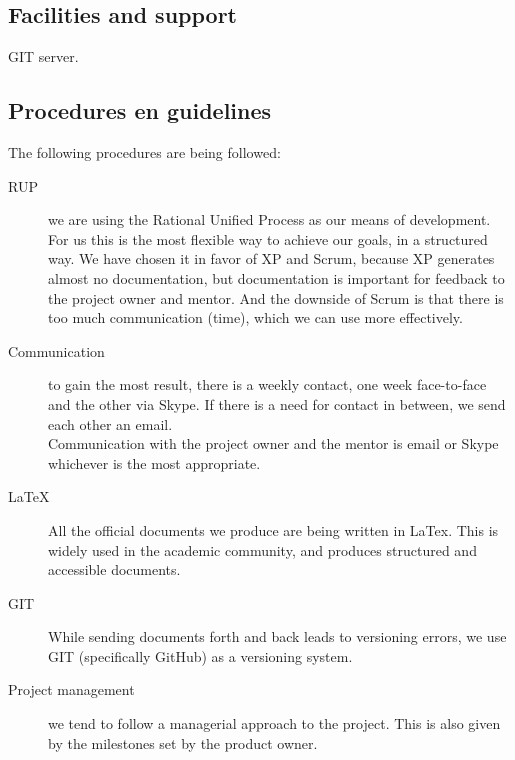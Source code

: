 \documentclass{article}
\begin{document}
\subsection{Facilities and support}

GIT server.

\subsection{Procedures en guidelines}
The following procedures are being followed:
\begin{description}
  \item[RUP] we are using the Rational Unified Process as our means of
    development. For us this is the most flexible way to achieve our goals, in
    a structured way. We have chosen it in favor of XP and Scrum, because XP
    generates almost no documentation, but documentation is important for
    feedback to the project owner and mentor. And the downside of Scrum is that
    there is too much communication (time), which we can use more effectively.
  \item[Communication] to gain the most result, there is a weekly contact, one
    week face-to-face and the other via Skype. If there is a need for contact
    in between, we send each other an email.\\
    Communication with the project owner and the mentor is email or Skype
    whichever is the most appropriate.
  \item[LaTeX] All the official documents we produce are being written in
    LaTex. This is widely used in the academic community, and produces
    structured and accessible documents.
  \item[GIT] While sending documents forth and back leads to versioning errors,
    we use GIT (specifically GitHub) as a versioning system.
  \item[Project management] we tend to follow a managerial approach to the
    project. This is also given by the milestones set by the product owner.
\end{description}
\end{document}
